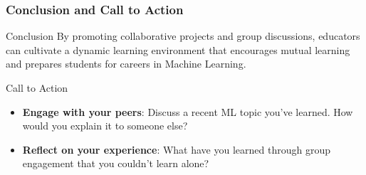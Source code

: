 \documentclass[aspectratio=169]{beamer}
\begin{document}
\begin{frame}[fragile]
    \frametitle{Conclusion and Call to Action}
    \begin{block}{Conclusion}
        By promoting collaborative projects and group discussions, educators can cultivate a dynamic learning environment that encourages mutual learning and prepares students for careers in Machine Learning.
    \end{block}
    
    \begin{block}{Call to Action}
        \begin{itemize}
            \item \textbf{Engage with your peers}: Discuss a recent ML topic you’ve learned. How would you explain it to someone else?
            \item \textbf{Reflect on your experience}: What have you learned through group engagement that you couldn’t learn alone?
        \end{itemize}
    \end{block}
\end{frame}
\end{document}
